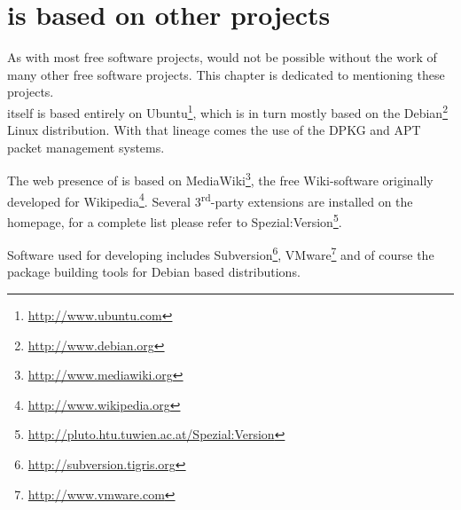 \section{\tunix is based on other projects}
As with most free software projects, \tunix would not be possible without the
work of many other free software projects. This chapter is dedicated to
mentioning these projects.\\

\tunix itself is based entirely on Ubuntu\footnote{\href{http://www.ubuntu.com}%
{http://www.ubuntu.com}}, which is in turn mostly based on the Debian\footnote{%
\href{http://www.debian.org}{http://www.debian.org}} Linux distribution. With
that lineage comes the use of the DPKG and APT packet management systems.

The web presence of \tunix is based on MediaWiki\footnote{\href{%
http://www.mediawiki.org}{http://www.mediawiki.org}}, the free Wiki-software
originally developed for Wikipedia\footnote{\href{http://www.wikipedia.org}%
{http://www.wikipedia.org}}. Several 3\textsuperscript{rd}-party extensions are installed on
the \tunix homepage, for a complete list please refer to
Spezial:Version\footnote{\href{http://pluto.htu.tuwien.ac.at/Spezial:Version}{%
http://pluto.htu.tuwien.ac.at/Spezial:Version}}.

Software used for developing \tunix includes Subversion\footnote{\href{%
http://subversion.tigris.org}{http://subversion.tigris.org}},
VMware\footnote{\href{http://www.vmware.com}{http://www.vmware.com}} and of
course the package building tools for Debian based distributions.

